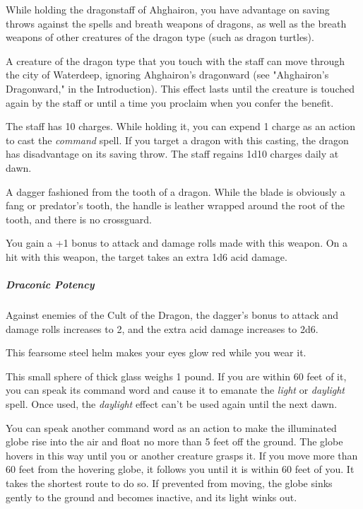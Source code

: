 \documentclass[10pt,a4paper,twoside,bg=print,twocolumn,openany,nodeprecatedcode]{dndbook}
\begin{document}
While holding the dragonstaff of Ahghairon, you have advantage on saving throws against the spells and breath weapons of dragons, as well as the breath weapons of other creatures of the dragon type (such as dragon turtles).

A creature of the dragon type that you touch with the staff can move through the city of Waterdeep, ignoring Ahghairon's dragonward (see "Ahghairon's Dragonward," in the Introduction). This effect lasts until the creature is touched again by the staff or until a time you proclaim when you confer the benefit.

The staff has 10 charges. While holding it, you can expend 1 charge as an action to cast the \textit{command} spell. If you target a dragon with this casting, the dragon has disadvantage on its saving throw. The staff regains 1d10 charges daily at dawn.

A dagger fashioned from the tooth of a dragon. While the blade is obviously a fang or predator's tooth, the handle is leather wrapped around the root of the tooth, and there is no crossguard.

You gain a +1 bonus to attack and damage rolls made with this weapon. On a hit with this weapon, the target takes an extra 1d6 acid damage.

\subparagraph{Draconic Potency}
Against enemies of the Cult of the Dragon, the dagger's bonus to attack and damage rolls increases to 2, and the extra acid damage increases to 2d6.

This fearsome steel helm makes your eyes glow red while you wear it.

This small sphere of thick glass weighs 1 pound. If you are within 60 feet of it, you can speak its command word and cause it to emanate the \textit{light} or \textit{daylight} spell. Once used, the \textit{daylight} effect can't be used again until the next dawn.

You can speak another command word as an action to make the illuminated globe rise into the air and float no more than 5 feet off the ground. The globe hovers in this way until you or another creature grasps it. If you move more than 60 feet from the hovering globe, it follows you until it is within 60 feet of you. It takes the shortest route to do so. If prevented from moving, the globe sinks gently to the ground and becomes inactive, and its light winks out.
\end{document}
